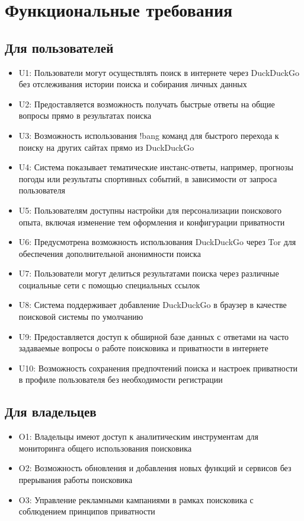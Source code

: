 \documentclass[12pt,a4paper]{article}
\begin{document}
\section{Функциональные требования}
\subsection{Для пользователей}
\begin{itemize}
    \item U1: Пользователи могут осуществлять поиск в интернете через DuckDuckGo без отслеживания истории поиска и собирания личных данных
    \item U2: Предоставляется возможность получать быстрые ответы на общие вопросы прямо в результатах поиска
    \item U3: Возможность использования !bang команд для быстрого перехода к поиску на других сайтах прямо из DuckDuckGo
    \item U4: Система показывает тематические инстанс-ответы, например, прогнозы погоды или результаты спортивных событий, в зависимости от запроса пользователя
    \item U5: Пользователям доступны настройки для персонализации поискового опыта, включая изменение тем оформления и конфигурации приватности
    \item U6: Предусмотрена возможность использования DuckDuckGo через Tor для обеспечения дополнительной анонимности поиска
    \item U7: Пользователи могут делиться результатами поиска через различные социальные сети с помощью специальных ссылок
    \item U8: Система поддерживает добавление DuckDuckGo в браузер в качестве поисковой системы по умолчанию
    \item U9: Предоставляется доступ к обширной базе данных с ответами на часто задаваемые вопросы о работе поисковика и приватности в интернете
    \item U10: Возможность сохранения предпочтений поиска и настроек приватности в профиле пользователя без необходимости регистрации
\end{itemize}
\subsection{Для владельцев}
\begin{itemize}
    \item O1: Владельцы имеют доступ к аналитическим инструментам для мониторинга общего использования поисковика
    \item O2: Возможность обновления и добавления новых функций и сервисов без прерывания работы поисковика
    \item O3: Управление рекламными кампаниями в рамках поисковика с соблюдением принципов приватности
\end{itemize}
\end{document}
